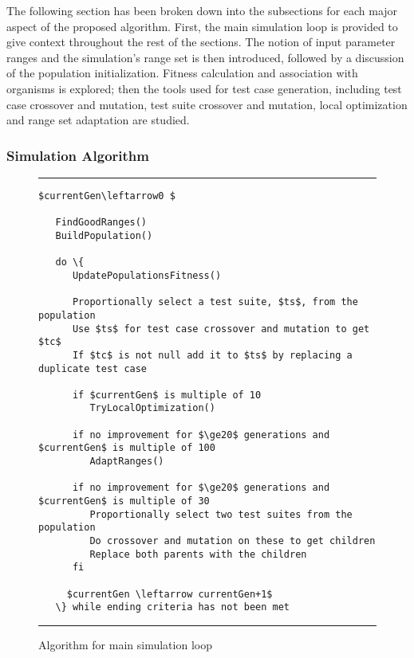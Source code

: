 \documentclass[runningheads]{llncs}
\begin{document}
The following section has been broken down into the subsections for each major aspect of the proposed algorithm. First, the main simulation loop is provided to give context throughout the rest of the sections. The notion of input parameter ranges and the simulation's range set is then introduced, followed by a discussion of the population initialization. Fitness calculation and association with organisms is explored; then the tools used for test case generation, including test case crossover and mutation, test suite crossover and mutation, local optimization and range set adaptation are studied.

\subsubsection{Simulation Algorithm}

\begin{figure}[h!]
	\begin{center}
		\hrule
		\medskip
\begin{Verbatim}[fontfamily=tt, xleftmargin=10pt, commandchars=\\\{\},
codes={\catcode`$=3\catcode`^=7\catcode`_=8}]
   $currentGen\leftarrow0 $
   
   FindGoodRanges()
   BuildPopulation()
   
   do \{
      UpdatePopulationsFitness()
   
      Proportionally select a test suite, $ts$, from the population
      Use $ts$ for test case crossover and mutation to get $tc$
      If $tc$ is not null add it to $ts$ by replacing a duplicate test case
   
      if $currentGen$ is multiple of 10
         TryLocalOptimization()
   
      if no improvement for $\ge20$ generations and $currentGen$ is multiple of 100
         AdaptRanges()
   
      if no improvement for $\ge20$ generations and $currentGen$ is multiple of 30 
         Proportionally select two test suites from the population
         Do crossover and mutation on these to get children
         Replace both parents with the children
      fi
   
     $currentGen \leftarrow currentGen+1$
   \} while ending criteria has not been met
\end{Verbatim}
\hrule
	\end{center}
	\caption{Algorithm for main simulation loop \label{fig:simLoopAlt}}
\end{figure}
\FloatBarrier
\end{document}
